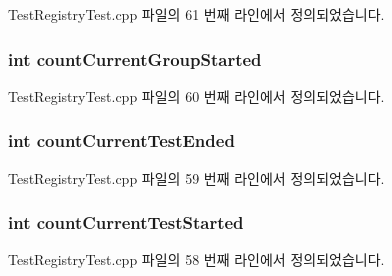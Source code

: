 Test\+Registry\+Test.\+cpp 파일의 61 번째 라인에서 정의되었습니다.

\subsubsection[{\texorpdfstring{count\+Current\+Group\+Started}{countCurrentGroupStarted}}]{\setlength{\rightskip}{0pt plus 5cm}int count\+Current\+Group\+Started}\hypertarget{class_mock_test_result_aa2c53e1231fb150773dd07317a558cb8}{}\label{class_mock_test_result_aa2c53e1231fb150773dd07317a558cb8}


Test\+Registry\+Test.\+cpp 파일의 60 번째 라인에서 정의되었습니다.

\subsubsection[{\texorpdfstring{count\+Current\+Test\+Ended}{countCurrentTestEnded}}]{\setlength{\rightskip}{0pt plus 5cm}int count\+Current\+Test\+Ended}\hypertarget{class_mock_test_result_a12a5dd36206618671dfe46b40eb9965b}{}\label{class_mock_test_result_a12a5dd36206618671dfe46b40eb9965b}


Test\+Registry\+Test.\+cpp 파일의 59 번째 라인에서 정의되었습니다.

\subsubsection[{\texorpdfstring{count\+Current\+Test\+Started}{countCurrentTestStarted}}]{\setlength{\rightskip}{0pt plus 5cm}int count\+Current\+Test\+Started}\hypertarget{class_mock_test_result_a82901871bc09b0d608c07cf130cc6eab}{}\label{class_mock_test_result_a82901871bc09b0d608c07cf130cc6eab}


Test\+Registry\+Test.\+cpp 파일의 58 번째 라인에서 정의되었습니다.

